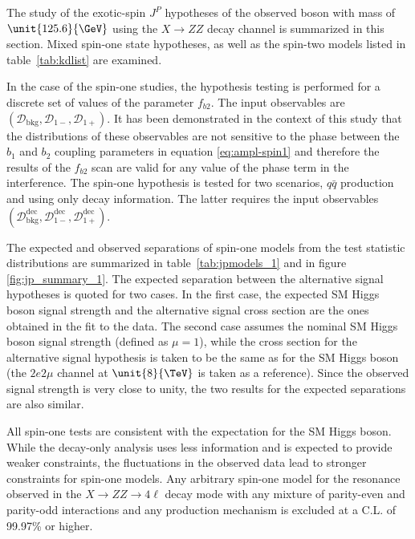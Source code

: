 The study of the exotic-spin $J^P$ hypotheses of the observed boson with mass of $\unit{125.6}{\GeV}$ using the $X \to ZZ$ decay channel is summarized in this section. Mixed spin-one state hypotheses, as well as the spin-two models listed in table~\ref{tab:kdlist} are examined.

In the case of the spin-one studies, the hypothesis testing is performed for a discrete set of values of the parameter $f_{b2}$. The input observables are $\left(\mathcal{D}_\text{bkg}, \mathcal{D}_{1-}, \mathcal{D}_{1+}\right)$. It has been demonstrated in the context of this study that the distributions of these observables are not sensitive to the phase between the $b_1$ and $b_2$ coupling parameters in equation \eqref{eq:ampl-spin1} and therefore the results of the $f_{b2}$ scan are valid for any value of the phase term in the interference. The spin-one hypothesis is tested for
two scenarios, $q\bar{q}$ production and using only decay information. The latter requires the input observables $\left(\mathcal{D}_\text{bkg}^\text{dec},\mathcal{D}_{1-}^\text{dec},\mathcal{D}_{1+}^\text{dec}\right)$.

The expected and observed separations of spin-one models from the test statistic distributions
are summarized in table~\ref{tab:jpmodels_1} and in figure \ref{fig:jp_summary_1}.
The expected separation between the alternative signal hypotheses is
quoted for two cases. In the first case, the expected SM Higgs boson
signal strength and the alternative signal cross section are
the ones obtained in the fit to the data.
The second case assumes the nominal SM Higgs boson signal strength
(defined as $\mu=1$), while the cross section for the alternative signal hypothesis is
taken to be the same as for the SM Higgs boson (the $2e2\mu$
channel at $\unit{8}{\TeV}$ is taken as a reference). Since the observed signal strength
is very close to unity, the two results for the expected separations are also similar.

All spin-one tests are consistent with the expectation for the SM Higgs boson.
While the decay-only analysis uses less information and is expected to provide weaker constraints,
the fluctuations in the observed data lead to stronger constraints for spin-one models. Any arbitrary spin-one model for the resonance observed in the $X \to ZZ\to 4\ell$ decay mode with any
mixture of parity-even and parity-odd interactions and any production mechanism is excluded at a C.L. of
99.97\% or higher.

